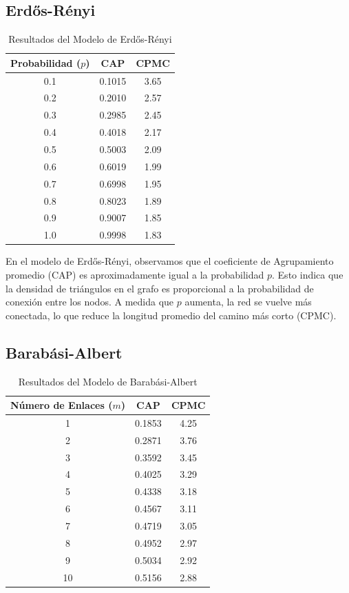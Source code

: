 \documentclass[12pt]{book}
\begin{document}
\subsection{Erdős-Rényi}
\begin{table}[h!]
\centering
\begin{tabular}{ccc}
\toprule
Probabilidad ($p$) & CAP & CPMC \\
\midrule
0.1 & 0.1015 & 3.65 \\
0.2 & 0.2010 & 2.57 \\
0.3 & 0.2985 & 2.45 \\
0.4 & 0.4018 & 2.17 \\
0.5 & 0.5003 & 2.09 \\
0.6 & 0.6019 & 1.99 \\
0.7 & 0.6998 & 1.95 \\
0.8 & 0.8023 & 1.89 \\
0.9 & 0.9007 & 1.85 \\
1.0 & 0.9998 & 1.83 \\
\bottomrule
\end{tabular}
\caption{Resultados del Modelo de Erdős-Rényi}
\label{tab:erdos-renyi}
\end{table}

En el modelo de Erdős-Rényi, observamos que el coeficiente de Agrupamiento promedio (CAP) es aproximadamente igual a la probabilidad $p$. Esto indica que la densidad de triángulos en el grafo es proporcional a la probabilidad de conexión entre los nodos. A medida que $p$ aumenta, la red se vuelve más conectada, lo que reduce la longitud promedio del camino más corto (CPMC).

\subsection{Barabási-Albert}

\begin{table}[h!]
\centering
\begin{tabular}{ccc}
\toprule
Número de Enlaces ($m$) & CAP & CPMC \\
\midrule
1 & 0.1853 & 4.25 \\
2 & 0.2871 & 3.76 \\
3 & 0.3592 & 3.45 \\
4 & 0.4025 & 3.29 \\
5 & 0.4338 & 3.18 \\
6 & 0.4567 & 3.11 \\
7 & 0.4719 & 3.05 \\
8 & 0.4952 & 2.97 \\
9 & 0.5034 & 2.92 \\
10 & 0.5156 & 2.88 \\
\bottomrule
\end{tabular}
\caption{Resultados del Modelo de Barabási-Albert}
\label{tab:barabasi-albert}
\end{table}
\end{document}
